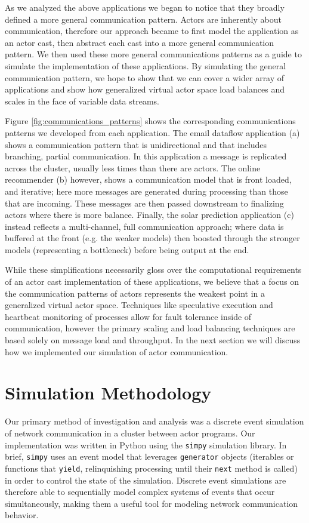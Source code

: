 \documentclass[conference,twocolumn,10pt]{IEEEtran}
\begin{document}
As we analyzed the above applications we began to notice that they broadly defined a more general communication pattern. Actors are inherently about communication, therefore our approach became to first model the application as an actor cast, then abstract each cast into a more general communication pattern. We then used these more general communications patterns as a guide to simulate the implementation of these applications. By simulating the general communication pattern, we hope to show that we can cover a wider array of applications and show how generalized virtual actor space load balances and scales in the face of variable data streams.

Figure \ref{fig:communications_patterns} shows the corresponding communications patterns we developed from each application. The email dataflow application (a) shows a communication pattern that is unidirectional and that includes branching, partial communication. In this application a message is replicated across the cluster, usually less times than there are actors. The online recommender (b) however, shows a communication model that is front loaded, and iterative; here more messages are generated during processing than those that are incoming. These messages are then passed downstream to finalizing actors where there is more balance. Finally, the solar prediction application (c) instead reflects a multi-channel, full communication approach; where data is buffered at the front (e.g. the weaker models) then boosted through the stronger models (representing a bottleneck) before being output at the end.

While these simplifications necessarily gloss over the computational requirements of an actor cast implementation of these applications, we believe that a focus on the communication patterns of actors represents the weakest point in a generalized virtual actor space. Techniques like speculative execution and heartbeat monitoring of processes allow for fault tolerance inside of communication, however the primary scaling and load balancing techniques are based solely on message load and throughput. In the next section we will discuss how we implemented our simulation of actor communication.

\section{Simulation Methodology}

Our primary method of investigation and analysis was a discrete event simulation of network communication in a cluster between actor programs. Our implementation was written in Python using the \texttt{simpy} \cite{matloff_introduction_2008} simulation library. In brief, \texttt{simpy} uses an event model that leverages \texttt{generator} objects (iterables or functions that \texttt{yield}, relinquishing processing until their \texttt{next} method is called) in order to control the state of the simulation. Discrete event simulations are therefore able to sequentially model complex systems of events that occur simultaneously, making them a useful tool for modeling network communication behavior.
\end{document}
